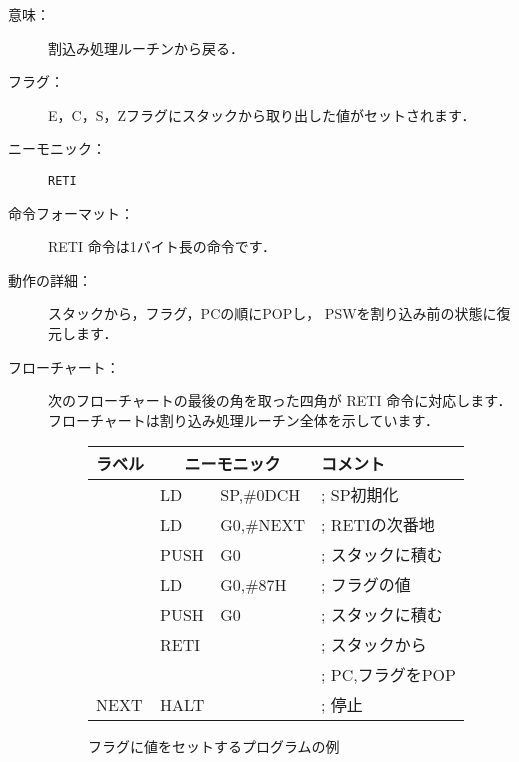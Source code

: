 \begin{description}
\item[意味：]割込み処理ルーチンから戻る．

\item[フラグ：]E，C，S，Zフラグにスタックから取り出した値がセットされます．

\item[ニーモニック：] {\tt RETI}

\item[命令フォーマット：]RETI 命令は1バイト長の命令です．


\item[動作の詳細：]
スタックから，フラグ，PCの順にPOPし，
PSWを割り込み前の状態に復元します．

\item[フローチャート：]
次のフローチャートの最後の角を取った四角が RETI 命令に対応します．
フローチャートは割り込み処理ルーチン全体を示しています．

\begin{center}
\end{center}

\begin{figure}[btp]
{\small\tt\begin{center}
\begin{tabular}{|l|l l l|} \hline
ラベル & \multicolumn{2}{|c}{ニーモニック} & コメント      \\
\hline
      & LD    & SP,\#0DCH         & ; SP初期化       \\
      & LD    & G0,\#NEXT         & ; RETIの次番地   \\
      & PUSH  & G0                & ; スタックに積む \\
      & LD    & G0,\#87H          & ; フラグの値     \\
      & PUSH  & G0                & ; スタックに積む \\
      & RETI  &                   & ; スタックから   \\
      &       &                   & ; PC,フラグをPOP \\
NEXT  & HALT  &                   & ; 停止           \\
\hline
\end{tabular}
\end{center}}
\caption{フラグに値をセットするプログラムの例}
\label{fig:chap6:flag}
\end{figure}

\end{description}

